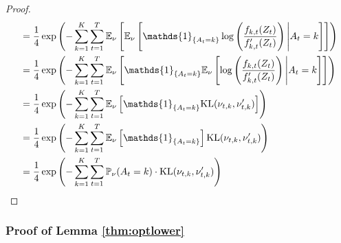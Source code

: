 \begin{proof}
\begin{align*}
        &= \frac{1}{4} \exp \left(-\sum_{k=1}^K\sum_{t=1}^T\E_{\nu}\left[\E_{\nu}\left[\mathds{1}_{\Bp{A_t=k}}\log\Sp{\frac{f_{k, t}(Z_t)}{f_{k, t}'(Z_t)}} \Bigg| A_t = k\right]\right]\right) \\
        &= \frac{1}{4} \exp \left(-\sum_{k=1}^K\sum_{t=1}^T\E_{\nu}\left[\mathds{1}_{\Bp{A_t=k}}\E_{\nu}\left[\log\Sp{\frac{f_{k, t}(Z_t)}{f_{k, t}'(Z_t)}} \Bigg| A_t = k\right]\right]\right) \\
        &= \frac{1}{4} \exp \left(-\sum_{k=1}^K\sum_{t=1}^T\E_{\nu}\left[\mathds{1}_{\Bp{A_t=k}}\mathrm{KL}(\nu_{t,k}, \nu'_{t,k})\right]\right) \\
        &= \frac{1}{4} \exp \left(-\sum_{k=1}^K\sum_{t=1}^T\E_{\nu}\left[\mathds{1}_{\Bp{A_t=k}}\right]\mathrm{KL}(\nu_{t,k}, \nu'_{t,k})\right) \\
        &= \frac{1}{4} \exp \left(-\sum_{k=1}^K\sum_{t=1}^T\P_{\nu}(A_t=k) \cdot \mathrm{KL}(\nu_{t,k}, \nu'_{t,k})\right)
    \end{align*}
\end{proof}
\subsubsection{Proof of Lemma \ref{thm:optlower}}

